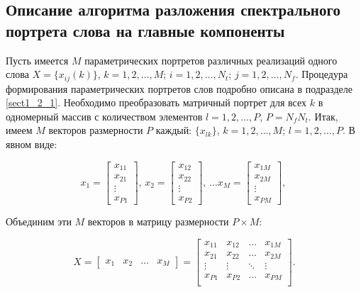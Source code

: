 
\subsection{Описание алгоритма разложения спектрального портрета слова на главные компоненты} \label{sect2_3_1}

Пусть имеется $M$ параметрических портретов различных реализаций одного слова $X = \{x_{ij}(k)\}$, $k = 1, 2, \dots, M$; $i = 1, 2, \dots, N_t$; $j = 1, 2, \dots, N_f$.
Процедура формирования параметрических портретов слов подробно описана в подразделе \ref{sect1_2_1}.
Необходимо преобразовать матричный портрет для всех $k$ в одномерный массив с количеством элементов $l = 1, 2, \dots, P$, $P = N_f N_t$.
Итак, имеем $M$ векторов размерности $P$ каждый: $\{x_{lk}\}$, $k = 1, 2, \dots, M$; $l = 1, 2, \dots, P$.
В явном виде:

\begin{equation} \label{eq:2_3_1_1}
x_1 = \begin{bmatrix} x_{11} \\ x_{21} \\ \vdots \\ x_{P1} \end{bmatrix} \text{,  }
x_2 = \begin{bmatrix} x_{12} \\ x_{22} \\ \vdots \\ x_{P2} \end{bmatrix} \text{,  }
\dots
x_M = \begin{bmatrix} x_{1M} \\ x_{2M} \\ \vdots \\ x_{PM} \end{bmatrix} \text{,  }
\end{equation}

Объединим эти $M$ векторов в матрицу размерности $P \times M$:

\begin{equation} \label{eq:2_3_1_2}
X = \begin{bmatrix} x_1 & x_2 & \dots & x_M \end{bmatrix} = 
\begin{bmatrix}
x_{11} & x_{12} & \dots  & x_{1M} \\
x_{21} & x_{22} & \dots  & x_{2M} \\ 
\vdots & \vdots & \ddots & \vdots \\
x_{P1} & x_{P2} & \dots  & x_{PM} \\
\end{bmatrix}.
\end{equation}

